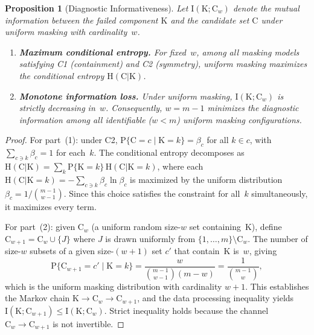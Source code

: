 \documentclass[12pt]{article}
\newcommand{\RV}[1]{\mathrm{#1}}
\newcommand{\Prob}[1]{\mathrm{P}\{#1\}}
\newcommand{\cand}{\RV{C}}         %
\newtheorem{proposition}[theorem]{Proposition}
\theoremstyle{definition}
\theoremstyle{remark}
\begin{document}
\begin{proposition}[Diagnostic Informativeness]
\label{prop:mutual_info}
Let $\RV{I}(\RV{K}; \cand_w)$ denote the mutual information between the failed component $\RV{K}$ and the candidate set $\cand$ under uniform masking with cardinality~$w$.
\begin{enumerate}
\item \textbf{Maximum conditional entropy.} For fixed~$w$, among all masking models satisfying \emph{C1} (containment) and \emph{C2} (symmetry), uniform masking maximizes the conditional entropy $\RV{H}(\cand | \RV{K})$.
\item \textbf{Monotone information loss.} Under uniform masking, $\RV{I}(\RV{K}; \cand_w)$ is strictly decreasing in~$w$. Consequently, $w = m-1$ minimizes the diagnostic information among all identifiable ($w < m$) uniform masking configurations.
\end{enumerate}
\end{proposition}

\begin{proof}
For part~(1): under C2, $\Prob{\cand = c \mid \RV{K} = k} = \beta_c$ for all $k \in c$, with $\sum_{c \ni k} \beta_c = 1$ for each~$k$. The conditional entropy decomposes as $\RV{H}(\cand | \RV{K}) = \sum_k \Prob{\RV{K}=k}\, \RV{H}(\cand | \RV{K}=k)$, where each $\RV{H}(\cand | \RV{K}=k) = -\sum_{c \ni k} \beta_c \ln \beta_c$ is maximized by the uniform distribution $\beta_c = 1/\binom{m-1}{w-1}$. Since this choice satisfies the constraint for all~$k$ simultaneously, it maximizes every term.

For part~(2): given $\cand_w$ (a uniform random size-$w$ set containing~$\RV{K}$), define $\cand_{w+1} = \cand_w \cup \{J\}$ where $J$ is drawn uniformly from $\{1,\ldots,m\} \setminus \cand_w$. The number of size-$w$ subsets of a given size-$(w+1)$ set $c'$ that contain~$\RV{K}$ is~$w$, giving
\begin{equation*}
\Prob{\cand_{w+1} = c' \mid \RV{K} = k} = \frac{w}{\binom{m-1}{w-1}(m-w)} = \frac{1}{\binom{m-1}{w}},
\end{equation*}
which is the uniform masking distribution with cardinality $w+1$. This establishes the Markov chain $\RV{K} \to \cand_w \to \cand_{w+1}$, and the data processing inequality yields $\RV{I}(\RV{K}; \cand_{w+1}) \leq \RV{I}(\RV{K}; \cand_w)$. Strict inequality holds because the channel $\cand_w \to \cand_{w+1}$ is not invertible.
\end{proof}
\end{document}
